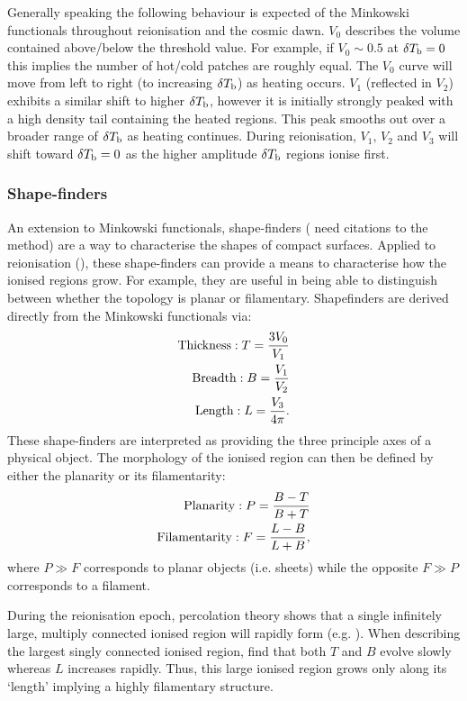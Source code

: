 Generally speaking the following behaviour is expected of the Minkowski functionals throughout reionisation and the cosmic dawn. $V_{0}$ describes the volume contained above/below the threshold value. For example, if $V_{0} \sim 0.5$ at $\delta T_{\rm b} = 0$ this implies the number of hot/cold patches are roughly equal. The $V_{0}$ curve will move from left to right (to increasing $\delta T_{\rm b}$) as heating occurs. $V_{1}$ (reflected in $V_{2}$) exhibits a similar shift to higher $\delta T_{\rm b}$, however it is initially strongly peaked with a high density tail containing the heated regions. This peak smooths out over a broader range of $\delta T_{\rm b}$ as heating continues. During reionisation, $V_{1}$, $V_{2}$ and $V_{3}$ will shift toward $\delta T_{\rm b}=0$ as the higher amplitude $\delta T_{\rm b}$ regions ionise first.

\subsubsection{Shape-finders}

An extension to Minkowski functionals, shape-finders ({\color{red} need citations to the method}) are a way to characterise the shapes of compact surfaces. Applied to reionisation (\cite{Bag:2018,Bag:2019}), these shape-finders can provide a means to characterise how the ionised regions grow. For example, they are useful in being able to distinguish between whether the topology is planar or filamentary. Shapefinders are derived directly from the Minkowski functionals via:
\begin{eqnarray}
{\rm Thickness}: T = \frac{3V_{0}}{V_{1}} \\
{\rm Breadth}: B = \frac{V_{1}}{V_{2}} \\
{\rm Length}: L =  \frac{V_{3}}{4\pi}.
\end{eqnarray}
These shape-finders are interpreted as providing the three principle axes of a physical object. The morphology of the ionised region can then be defined by either the planarity or its filamentarity:
\begin{eqnarray}
{\rm Planarity}: P = \frac{B - T}{B + T} \\
{\rm Filamentarity}: F = \frac{L - B}{L+B},
\end{eqnarray}
where $P\gg F$ corresponds to planar objects (i.e. sheets) while the opposite $F\gg P$ corresponds to a filament.

During the reionisation epoch, percolation theory shows that a single infinitely large, multiply connected ionised region will rapidly form (e.g. \cite{Furlanetto:2016}). When describing the largest singly connected ionised region, \cite{Bag:2018,Bag:2019} find that both $T$ and $B$ evolve slowly whereas $L$ increases rapidly. Thus, this large ionised region grows only along its `length' implying a highly filamentary structure.

